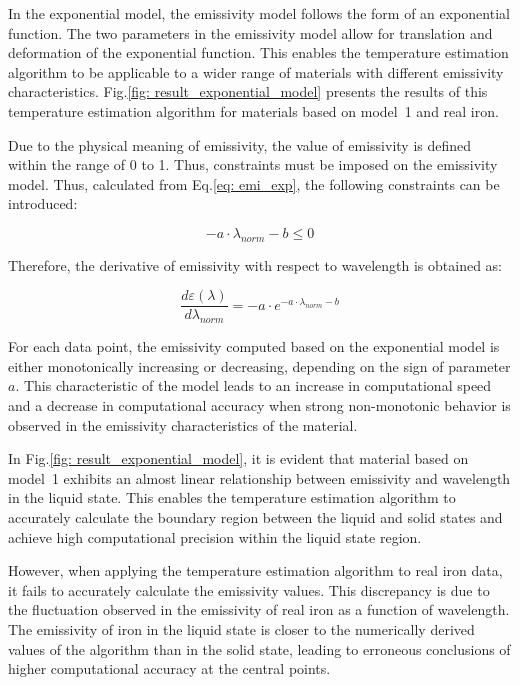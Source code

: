In the exponential model, the emissivity model follows the form of an 
exponential function. The two parameters in the emissivity model allow for 
translation and deformation of the exponential function. This enables the 
temperature estimation algorithm to be applicable to a wider range of materials 
with different emissivity characteristics. Fig.\ref{fig: result_exponential_model} 
presents the results of this temperature estimation algorithm for materials 
based on \mbox{model 1} and real iron.


Due to the physical meaning of emissivity, the value of emissivity is defined 
within the range of 0 to 1. Thus, constraints must be imposed on the 
emissivity model. Thus, calculated from Eq.\ref{eq: emi_exp}, the following 
constraints can be introduced:


\begin{equation}
    -a \cdot \lambda_{norm} - b \leq 0
\end{equation}


Therefore, the derivative of emissivity with respect to wavelength is obtained as:


\begin{equation}
    \frac{d\varepsilon(\lambda)}{d\lambda_{norm}} = -a \cdot e^{-a \cdot \lambda_{norm} - b}
\end{equation}

For each data point, the emissivity computed based on the exponential model 
is either monotonically increasing or decreasing, depending on the sign of 
parameter $a$. This characteristic of the model leads to an increase in 
computational speed and a decrease in 
computational accuracy when strong non-monotonic behavior is observed in 
the emissivity characteristics of the material.

In Fig.\ref{fig: result_exponential_model}, it is evident that material based on 
\mbox{model 1} exhibits an almost linear relationship between emissivity and 
wavelength in the liquid state. This enables the temperature estimation 
algorithm to accurately calculate the boundary region between the liquid and 
solid states and achieve high computational precision within the liquid 
state region.

However, when applying the temperature estimation algorithm to real iron data, 
it fails to accurately calculate the emissivity values. This discrepancy is due 
to the fluctuation observed in the emissivity of real iron as a function of 
wavelength. The emissivity of iron in the liquid state is closer to the 
numerically derived values of the algorithm than in the solid state, leading 
to erroneous conclusions of higher computational accuracy at the central points.


